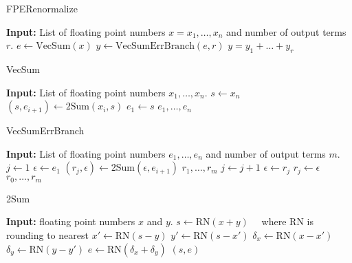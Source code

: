 \begin{algorithm}
    \caption{FPERenormalize}\label{alg:fpe_renorm}
    \begin{algorithmic}[1]
        \STATE \textbf{Input:} List of floating point numbers $x = x_1, \ldots, x_n$ and number of output terms $r$.
        \STATE $e \gets \text{VecSum}(x)$
        \STATE $y \gets \text{VecSumErrBranch}(e, r)$
        \RETURN $y = y_1 + \ldots + y_r$
    \end{algorithmic}
\end{algorithm}

\begin{algorithm}
    \caption{VecSum}\label{alg:vecsum}
    \begin{algorithmic}[1]
        \STATE \textbf{Input:} List of floating point numbers $x_1, \ldots, x_n$.
        \STATE $s \gets x_n$
            \STATE $(s, e_{i + 1}) \gets \text{2Sum}(x_i, s)$
        \ENDFOR
        \STATE $e_1 \gets s$
        \RETURN $e_1, \ldots, e_n$
    \end{algorithmic}
\end{algorithm}

\begin{algorithm}
\caption{VecSumErrBranch}\label{alg:vecsumerrbranch}
    \begin{algorithmic}[1]
        \STATE \textbf{Input:} List of floating point numbers $e_1, \ldots, e_n$ and number of output terms $m$.
        \STATE $j \gets 1$
        \STATE $\epsilon \gets e_1$
            \STATE $(r_j, \epsilon) \gets \text{2Sum}(\epsilon, e_{i + 1})$
                    \RETURN $r_1, \ldots, r_m$
                \ENDIF
                \STATE $j \gets j + 1$
            \ELSE
                \STATE $\epsilon \gets r_j$
            \ENDIF
        \ENDFOR
            \STATE $r_j \gets \epsilon$
        \ENDIF
        \RETURN $r_0, \ldots, r_m$
    \end{algorithmic}
\end{algorithm}

\begin{algorithm}
    \caption{2Sum}\label{alg:2sum}
    \begin{algorithmic}[1]
        \STATE \textbf{Input:} floating point numbers $x$ and $y$.
        \STATE $s \gets \text{RN}(x + y) \quad$ where RN is rounding to nearest
        \STATE $x' \gets \text{RN}(s - y)$
        \STATE $y' \gets \text{RN}(s - x')$
        \STATE $\delta_x \gets \text{RN}(x - x')$
        \STATE $\delta_y \gets \text{RN}(y - y')$
        \STATE $e \gets \text{RN}(\delta_x + \delta_y)$
        \RETURN $(s, e)$
    \end{algorithmic}
\end{algorithm}

